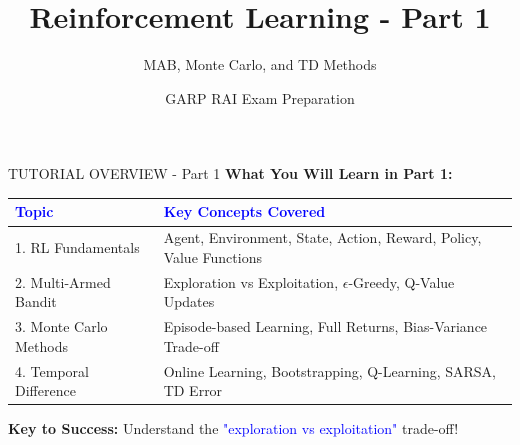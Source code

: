 \documentclass[8pt]{beamer}
\title{Reinforcement Learning - Part 1}
\subtitle{MAB, Monte Carlo, and TD Methods}
\author{GARP RAI Exam Preparation}
\date{}
\begin{document}
\begin{frame}
\titlepage
\end{frame}


\begin{frame}{TUTORIAL OVERVIEW - Part 1}
\fontsize{7}{8}\selectfont
\textbf{What You Will Learn in Part 1:}

\vspace{0.2cm}
\begin{tabular}{|p{2.5cm}|p{5.5cm}|}
\hline
\textcolor{blue}{Topic} & \textcolor{blue}{Key Concepts Covered} \\
\hline
1. RL Fundamentals & Agent, Environment, State, Action, Reward, Policy, Value Functions \\
\hline
2. Multi-Armed Bandit & Exploration vs Exploitation, $\epsilon$-Greedy, Q-Value Updates \\
\hline
3. Monte Carlo Methods & Episode-based Learning, Full Returns, Bias-Variance Trade-off \\
\hline
4. Temporal Difference & Online Learning, Bootstrapping, Q-Learning, SARSA, TD Error \\
\hline
\end{tabular}

\vspace{0.2cm}
\textbf{Key to Success:} Understand the \textcolor{blue}{"exploration vs exploitation"} trade-off!
\end{frame}
\end{document}
